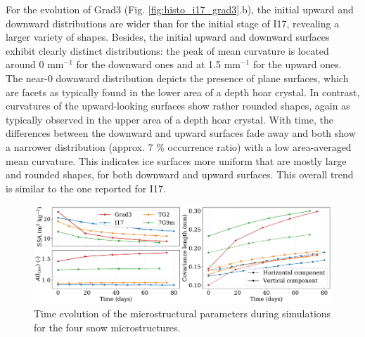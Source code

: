 \documentclass[draft,ms]{agujournal2019}
\begin{document}
For the evolution of Grad3 (Fig. \ref{fig:histo_i17_grad3}.b), the initial upward and downward distributions are wider than for the initial stage of I17, revealing a larger variety of shapes. Besides, the initial upward and downward surfaces exhibit clearly distinct distributions: the peak of mean curvature is located around 0 mm$^{-1}$ for the downward ones and at 1.5 mm$^{-1}$ for the upward ones. The near-0 downward distribution depicts the presence of plane surfaces, which are facets as typically found in the lower area of a depth hoar crystal. In contrast, curvatures of the upward-looking surfaces show rather rounded shapes, again as typically observed in the upper area of a depth hoar crystal. With time, the differences between the downward and upward surfaces fade away and both show a narrower distribution (approx. 7 \% occurrence ratio) with a low area-averaged mean curvature. This indicates ice surfaces more uniform that are mostly large and rounded shapes, for both downward and upward surfaces. This overall trend is similar to the one reported for I17.\\

\begin{figure}
    \centering
    \includegraphics[width=\linewidth]{Figures/4images_microstruct_new.pdf}
    \caption{Time evolution of the microstructural parameters during simulations for the four snow microstructures.}
    \label{fig:4_images_microstruct}
\end{figure}
\end{document}
